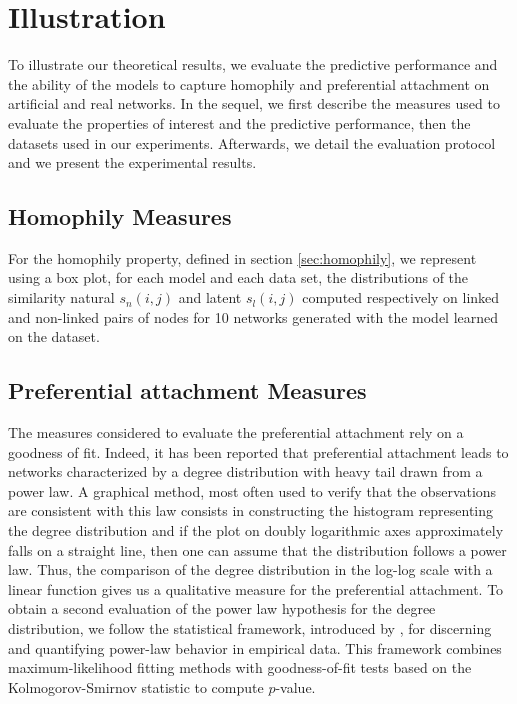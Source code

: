 \section{Illustration}

To illustrate our theoretical results, we evaluate the predictive performance and the ability of the models to capture homophily and preferential attachment on artificial and real networks. In the sequel, we first describe the measures used to evaluate the properties of interest and the predictive performance, then the datasets used in our experiments. Afterwards, we detail the evaluation protocol and we present the experimental results.

\subsection{Homophily Measures}

For the homophily property, defined in section \ref{sec:homophily}, we represent using a box plot, for each model and each data set, the distributions of the similarity natural $s_n(i,j)$ and latent $s_l(i,j)$ computed respectively on linked and non-linked pairs of nodes for 10 networks generated with the model learned on the dataset.


\subsection{Preferential attachment Measures}
\label{sec:experiments-burst}

The measures considered to evaluate the preferential attachment rely on a goodness of fit. Indeed, it has been reported that preferential attachment leads to networks characterized by a degree distribution with heavy tail drawn from a power law. A graphical method, most often used to verify that the observations are consistent with this law  consists in constructing the histogram representing the degree distribution and if the plot on doubly logarithmic axes approximately falls on a straight line, then one can assume that the distribution follows a power law. Thus, the comparison of the degree distribution in the log-log scale with a linear function gives us a qualitative measure for the preferential attachment. To obtain a second evaluation of the power law hypothesis for the degree distribution, we follow the statistical framework, introduced by \cite{clauset2009power}, for discerning and quantifying power-law behavior in empirical data. This framework combines maximum-likelihood fitting methods with goodness-of-fit tests based on the Kolmogorov-Smirnov statistic to compute $p$-value.

